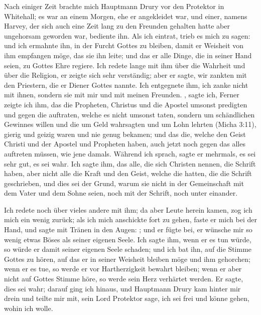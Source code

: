Nach einiger Zeit brachte mich Hauptmann 
Drury vor den
Protektor in Whitehall; es war an einem 
Morgen, ehe er angekleidet war, und einer, namens Harvey, 
der sich auch eine Zeit lang zu den Freunden gehalten hatte 
aber ungehorsam geworden war, bediente ihn. Als ich eintrat, 
trieb es mich zu sagen:  
und ich ermahnte ihn, in der Furcht
Gottes zu bleiben, damit er Weisheit von ihm empfangen möge,
das sie ihn leite; und das er alle Dinge, die in seiner Hand
seien, zu Gottes Ehre regiere. Ich redete lange mit ihm über
die Wahrheit und über die Religion, er 
zeigte sich sehr verständig;
aber er sagte, wir zankten mit den Priestern, die er Diener Gottes
nannte. Ich entgegnete ihm, ich zanke nicht mit ihnen, sondern
sie mit mir und mit meinen Freunden. , sagte 
ich, 
Ferner zeigte ich ihm, das die Propheten, Christus und die
Apostel umsonst predigten und gegen die auftraten, welche es
nicht umsonst taten, sondern um schändlichen Gewinnes willen
und die um Geld wahrsagten und um Lohn lehrten 
(Micha 3:11),
gierig und geizig waren und nie genug bekamen; und das die,
welche den Geist Christi und der Apostel und Propheten haben,
auch jetzt noch gegen das alles auftreten müssen, wie jene damals.
Während ich sprach, sagte er mehrmals, es sei sehr gut, es sei
wahr. Ich sagte ihm, das alle, die sich Christen nennen, die
Schrift haben, aber nicht alle die Kraft und 
den Geist, welche
die hatten, die die Schrift geschrieben, und dies sei der Grund,
warum sie nicht in der Gemeinschaft mit dem Vater und dem
Sohne seien, noch mit der Schrift, noch unter einander. 


Ich redete noch über vieles andere mit ihm; da aber Leute herein
kamen, zog ich mich ein wenig zurück; als ich mich anschickte fort
zu gehen, faste er mich bei der Hand, und sagte mit Tränen in
den Augen: ; und er fügte bei, er wünsche mir so wenig etwas
Böses als seiner eigenen Seele. Ich sagte ihm, wenn er es tun
würde, so würde er damit seiner eigenen Seele schaden; und ich
bat ihn, auf die Stimme Gottes zu hören, auf das er in seiner
Weisheit bleiben möge und ihm gehorchen; wenn er es tue, so
werde er vor Hartherzigkeit bewahrt bleiben; wenn er aber
nicht auf Gottes Stimme höre, so werde sein Herz verhärtet
werden. Er sagte, dies sei wahr; darauf ging ich hinaus, und
Hauptmann Drury kam hinter mir drein und teilte mir mit, sein
Lord Protektor sage, ich sei frei und könne gehen, wohin ich
wolle. 


